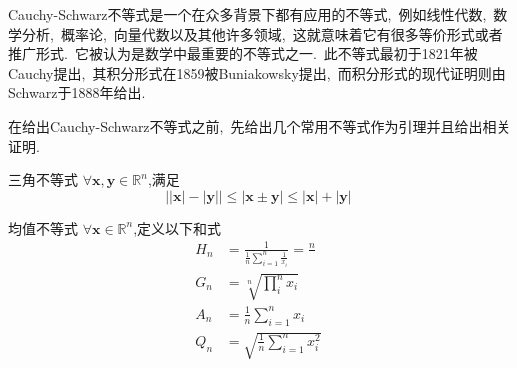 Cauchy-Schwarz不等式是一个在众多背景下都有应用的不等式,\ 例如线性代数,\ 数学分析,\ 概率论,\ 向量代数以及其他许多领域,\ 这就意味着它有很多等价形式或者推广形式.\ 它被认为是数学中最重要的不等式之一.\ 此不等式最初于1821年被Cauchy提出,\ 其积分形式在1859被Buniakowsky提出,\ 而积分形式的现代证明则由Schwarz于1888年给出.\ 

在给出Cauchy-Schwarz不等式之前,\ 先给出几个常用不等式作为引理并且给出相关证明.\ 
\begin{lemma}{三角不等式}
$\forall \boldsymbol{x},\boldsymbol{y}\in\mathbb{R}^n$,满足
\begin{equation}
\lvert\lvert\boldsymbol{x}\rvert-\lvert\boldsymbol{y}\rvert\rvert\leqslant\lvert\boldsymbol{x}\pm\boldsymbol{y}\rvert\leqslant\lvert\boldsymbol{x}\rvert+\lvert\boldsymbol{y}\rvert~
\end{equation}
\end{lemma}
\begin{lemma}{均值不等式}
$\forall \boldsymbol{x}\in\mathbb{R}^n$,定义以下和式
\begin{align}
H_n&=\frac{1}{\frac{1}{n}\sum_{i=1}^n\frac{1}{x_i}}=\frac{n}{}\\
G_n&=\sqrt[n]{\prod_{i}^n x_i}\\
A_n&=\frac{1}{n}\sum_{i=1}^n x_i\\
Q_n&=\sqrt{\frac{1}{n}\sum_{i=1}^n x_i^2}~
\end{align}
\end{lemma}
